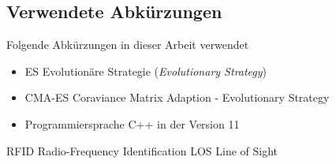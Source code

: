 \newpage
\subsection*{Verwendete Abkürzungen}
Folgende Abkürzungen in dieser Arbeit verwendet
\begin{itemize}
	\item	ES Evolutionäre Strategie (\textit{Evolutionary Strategy})
	\item	CMA-ES Coraviance Matrix Adaption - Evolutionary Strategy
	\item	{} Programmiersprache C++ in der Version 11
	
\end{itemize}
RFID Radio-Frequency Identification
LOS Line of Sight